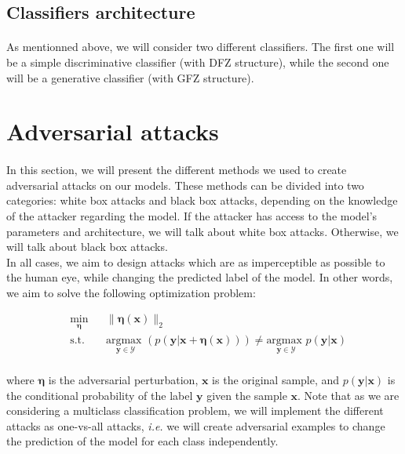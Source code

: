 \documentclass[11pt,twocolumn,letterpaper]{article}
\begin{document}
\subsection{Classifiers architecture}

\paragraph{} As mentionned above, we will consider two different classifiers. The first one will be a simple discriminative classifier (with DFZ structure), while the second one will be a generative classifier (with GFZ structure).

\section{Adversarial attacks}
\label{sec:attacks}

\paragraph{} In this section, we will present the different methods we used to create adversarial attacks on our models. These methods can be divided into two categories: white box attacks and black box attacks, depending on the knowledge of the attacker regarding the model. If the attacker has access to the model's parameters and architecture, we will talk about white box attacks. Otherwise, we will talk about black box attacks. \\
In all cases, we aim to design attacks which are as imperceptible as possible to the human eye, while changing the predicted label of the model. In other words, we aim to solve the following optimization problem:

\begin{equation*}
\begin{aligned}
& \underset{\bm{\eta}}{\text{min}}
& & \|\bm{\eta}(\bm{x})\|_2 \\
& \text{s.t.} 
& & \underset{\bm{y} \in \mathcal{Y}}{\text{argmax }}(p(\bm{y}|\bm{x} + \bm{\eta}(\bm{x}))) \neq \underset{\bm{y} \in \mathcal{Y}}{\text{argmax }}p(\bm{y}|\bm{x}) \\
\end{aligned}
\end{equation*}

where $\bm{\eta}$ is the adversarial perturbation, $\bm{x}$ is the original sample, and $p(\bm{y}|\bm{x})$ is the conditional probability of the label $\bm{y}$ given the sample $\bm{x}$. Note that as we are considering a multiclass classification problem, we will implement the different attacks as one-vs-all attacks, \textit{i.e.} we will create adversarial examples to change the prediction of the model for each class independently.
\end{document}

